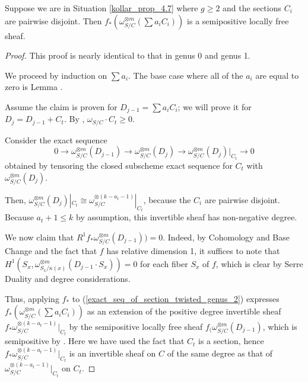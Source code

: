 \begin{lemma}\label{inductive_step_genus_2}
Suppose we are in Situation \ref{kollar_prop_4.7} where $g\ge2$ and the sections $C_i$ are pairwise disjoint.
Then $f_{*}(\omega_{S/C}^{\otimes m}(\sum a_iC_i))$ is a semipositive locally free sheaf.
\end{lemma}
\begin{proof}
This proof is nearly identical to that in genus 0 and genus 1.

We proceed by induction on $\sum a_i$.
The base case where all of the $a_i$ are equal to zero is Lemma .

Assume the claim is proven for $D_{j-1}=\sum a_iC_i$; we will prove it for $D_{j}=D_{j-1}+C_t$.
By , $\omega_{S/C}\cdot C_t\ge0$.

Consider the exact sequence
\begin{equation*}\label{exact_seq_of_section_twisted_genus_2}
0\to\omega_{S/C}^{\otimes m}(D_{j-1})\to\omega_{S/C}^{\otimes m}(D_j)\to \omega_{S/C}^{\otimes m}(D_j)|_{C_t}\to0
\end{equation*}
obtained by tensoring the closed subscheme exact sequence for $C_t$ with $\omega_{S/C}^{\otimes m}(D_j)$.

Then, $\omega_{S/C}^{\otimes m}(D_j)|_{C_t}\cong \omega_{S/C}^{\otimes (k-a_{t}-1)}|_{C_t}$, because the $C_i$ are pairwise disjoint.
Because $a_{t}+1\le k$ by assumption, this invertible sheaf has non-negative degree.

We now claim that $R^{1}f_{*}\omega_{S/C}^{\otimes m}(D_{j-1}))=0$.
Indeed, by Cohomology and Base Change and the fact that $f$ has relative dimension 1, it suffices to note that $H^{1}(S_x,\omega_{S_x/\kappa(x)}^{\otimes m}(D_{j-1}\cdot S_x))=0$ for each fiber $S_x$ of $f$, which is clear by Serre Duality and degree considerations.

Thus, applying $f_{*}$ to (\ref{exact_seq_of_section_twisted_genus_2}) expresses $f_{*}(\omega_{S/C}^{\otimes m}(\sum a_iC_i))$ as an extension of the positive degree invertible sheaf $f_{*}\omega_{S/C}^{\otimes (k-a_{t}-1)}|_{C_t}$ by the semipositive locally free sheaf $f_{(}\omega_{S/C}^{\otimes m}(D_{j-1})$, which is semipositive by .
Here we have used the fact that $C_t$ is a section, hence $f_{*}\omega_{S/C}^{\otimes (k-a_{t}-1)}|_{C_t}$ is an invertible sheaf on $C$ of the same degree as that of $\omega_{S/C}^{\otimes (k-a_{t}-1)}|_{C_t}$ on $C_t$.
\end{proof}

